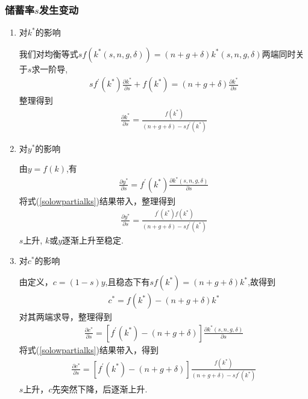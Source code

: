 \documentclass[UTF8, onecolumn, a4paper, 12pt]{article}
\begin{document}
\subsubsection*{储蓄率$s$发生变动}
\begin{enumerate}
	\item 对$k^*$的影响
	
	我们对均衡等式$s f\left(k^{*}(s, n, g, \delta)\right)=(n+g+\delta) k^{*}(s, n, g, \delta)$两端同时关于$s$求一阶导,
	\begin{align}
	s f^{\prime}\left(k^{*}\right) \frac{\partial k^{*}}{\partial s}+f\left(k^{*}\right) = 
	(n+g+\delta) \frac{\partial k^{*}}{\partial s}
	\end{align}
	整理得到
	\begin{align}\label{solowpartialks}
	\frac{\partial k^{*}}{\partial s} = \frac{f\left(k^{*}\right)}{(n+g+\delta)-s f^{\prime}\left(k^{*}\right)}
	\end{align}
	\item 对$y^*$的影响
	
	由$y=f(k)$,有
	\begin{align}
	\frac{\partial y^{*}}{\partial s} = 
	f^{\prime}\left(k^{*}\right) \frac{\partial k^{*}(s, n, g, \delta)}{\partial s}
	\end{align}
	将式(\ref{solowpartialks})结果带入，整理得到
	\begin{align}
	\frac{\partial y^{*}}{\partial s} = 
	\frac{f^{\prime}\left(k^{*}\right) f\left(k^{*}\right)}{(n+g+\delta)-s f^{\prime}\left(k^{*}\right)}
	\end{align}
	$s$上升, $k$或$y$逐渐上升至稳定.
	
	\item 对$c^*$的影响
	
	由定义，$c=(1-s)y$,且稳态下有$sf(k^*) = (n+g+\delta)k^*$,故得到
	\begin{align}
	c^{*} = f\left(k^{*}\right)-(n+g+\delta) k^{*}
	\end{align}
	对其两端求导，整理得到
	\begin{align}
	\frac{\partial c^{*}}{\partial s} = 
	\left[f^{\prime}\left(k^{*}\right)-(n+g+\delta)\right] 
	\frac{\partial k^{*}(s, n, g, \delta)}{\partial s}
	\end{align}
	将式(\ref{solowpartialks})结果带入，得到
	\begin{align}
	\frac{\partial c^{*}}{\partial s} = 
	\left[f^{\prime}\left(k^{*}\right)-(n+g+\delta)\right] 
	\frac{f\left(k^{*}\right)}{(n+g+\delta)-s f^{\prime}\left(k^{*}\right)}
	\end{align}
	$s$上升，$c$先突然下降，后逐渐上升.
\end{enumerate}
\end{document}
